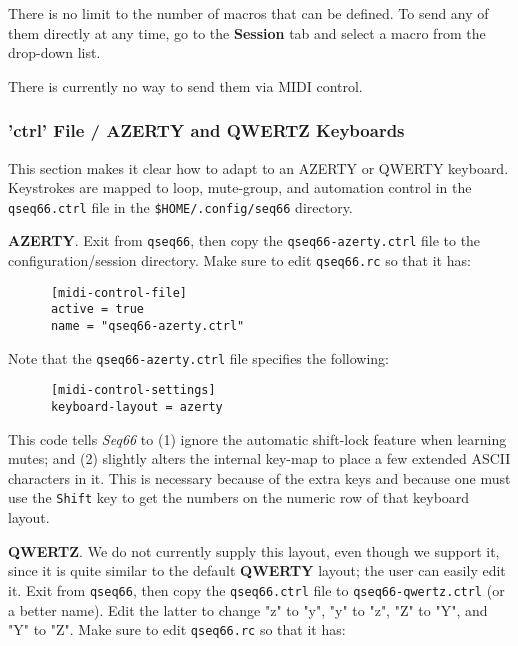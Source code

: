    There is no limit to the number of macros that can be defined.
   To send any of them directly at any time, go to the
   \textbf{Session} tab and select a macro from the drop-down list.

   There is currently no way to send them via MIDI control.




\subsubsection{'ctrl' File / AZERTY and QWERTZ Keyboards}
\label{subsubsec:configuration_ctrl_azerty}

   This section makes it clear how to adapt to an AZERTY or QWERTY keyboard.
   Keystrokes are mapped to loop, mute-group, and automation control in the
   \texttt{qseq66.ctrl} file in the \texttt{\$HOME/.config/seq66} directory.

   \textbf{AZERTY}.
   Exit from \texttt{qseq66}, then copy the \texttt{qseq66-azerty.ctrl}
   file to the configuration/session directory.
   Make sure to edit \texttt{qseq66.rc} so that it has:

   \begin{verbatim}
      [midi-control-file]
      active = true
      name = "qseq66-azerty.ctrl"
   \end{verbatim}

   Note that the \texttt{qseq66-azerty.ctrl} file specifies the following:

   \begin{verbatim}
      [midi-control-settings]
      keyboard-layout = azerty
   \end{verbatim}

   This code tells \textsl{Seq66} to (1) ignore the automatic shift-lock
   feature when learning mutes; and (2) slightly alters the internal key-map to
   place a few extended ASCII characters in it.  This is necessary because of
   the extra keys and because one must use the
   \texttt{Shift} key to get the numbers on
   the numeric row of that keyboard layout.

   \textbf{QWERTZ}.
   We do not currently supply this layout, even though we support it, since it is
   quite similar to the default \textbf{QWERTY} layout;
   the user can easily edit it.
   Exit from \texttt{qseq66}, then copy the \texttt{qseq66.ctrl}
   file to \texttt{qseq66-qwertz.ctrl} (or a better name).  Edit the latter to
   change "z" to "y", "y" to "z", "Z" to "Y", and "Y" to "Z".
   Make sure to edit \texttt{qseq66.rc} so that it has:

